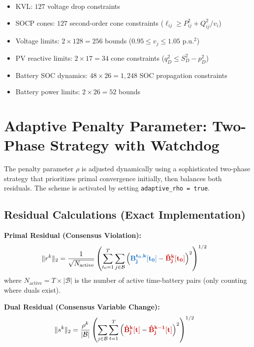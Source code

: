 \documentclass[11pt]{article}
\newcommand{\blueB}[1]{\textcolor{bluevar}{\mathbf{#1}}}      %
\newcommand{\redBhat}[1]{\textcolor{redvar}{\mathbf{#1}}}     %
\begin{document}
\begin{itemize}
\begin{itemize}
        \item KVL: $127$ voltage drop constraints
        \item SOCP cones: $127$ second-order cone constraints ($\ell_{ij} \geq P_{ij}^2 + Q_{ij}^2 / v_i$)
        \item Voltage limits: $2 \times 128 = 256$ bounds ($0.95 \leq v_j \leq 1.05$ p.u.$^2$)
        \item PV reactive limits: $2 \times 17 = 34$ cone constraints ($q_D^2 \leq S_D^2 - p_D^2$)
        \item Battery SOC dynamics: $48 \times 26 = 1,248$ SOC propagation constraints
        \item Battery power limits: $2 \times 26 = 52$ bounds
    \end{itemize}
\end{itemize}

\clearpage

\section{Adaptive Penalty Parameter: Two-Phase Strategy with Watchdog}

The penalty parameter $\rho$ is adjusted dynamically using a sophisticated two-phase strategy that prioritizes primal convergence initially, then balances both residuals. The scheme is activated by setting \texttt{adaptive\_rho = true}.

\subsection{Residual Calculations (Exact Implementation)}

\textbf{Primal Residual (Consensus Violation):}
\begin{align}
\|r^k\|_2 &= \frac{1}{\sqrt{N_{\text{active}}}} \left( \sum_{t_0=1}^T \sum_{j \in \mathcal{B}} \left( \blueB{B_j^{t_0,k}[t_0]} - \redBhat{\hat{B}_j^k[t_0]} \right)^2 \right)^{1/2}
\end{align}
where $N_{\text{active}} = T \times |\mathcal{B}|$ is the number of active time-battery pairs (only counting where duals exist).

\textbf{Dual Residual (Consensus Variable Change):}
\begin{align}
\|s^k\|_2 &= \frac{\rho^k}{|\mathcal{B}|} \left( \sum_{j \in \mathcal{B}} \sum_{t=1}^T \left( \redBhat{\hat{B}_j^k[t]} - \redBhat{\hat{B}_j^{k-1}[t]} \right)^2 \right)^{1/2}
\end{align}
\end{document}
